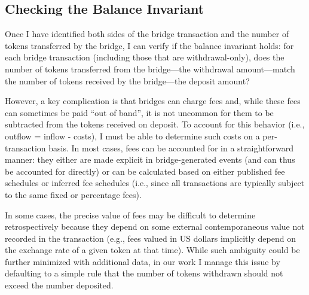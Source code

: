 \subsection{Checking the Balance Invariant}
Once I have identified both sides of the bridge transaction and the
number of tokens transferred by the bridge, I can verify if the
balance invariant holds: for each bridge transaction (including those
that are withdrawal-only), does the number of tokens transferred from
the bridge---the withdrawal amount---match the number of tokens
received by the bridge---the deposit amount?

However, a key complication is that bridges can charge fees and, while
these fees can sometimes be paid ``out of band'', it is not uncommon
for them to be subtracted from the tokens received on deposit.  To
account for this behavior (i.e., outflow = inflow - costs), I must be
able to determine such costs on a per-transaction basis.
In most cases, fees can be accounted for in a straightforward manner:
they either are made explicit in bridge-generated events (and can thus
be accounted for directly) or can be calculated based on either
published fee schedules or inferred fee schedules (i.e., since all
transactions are typically subject to the same fixed or percentage
fees).





In some cases, the precise value of fees may be difficult to determine
retrospectively because they depend on some external contemporaneous
value not recorded in the transaction (e.g., fees valued in US dollars
implicitly depend on the exchange rate of a given token at that time).
While such ambiguity could be further minimized with additional data,
in our work I manage this issue by defaulting to a simple rule
that the number of tokens withdrawn should not exceed the number
deposited.






